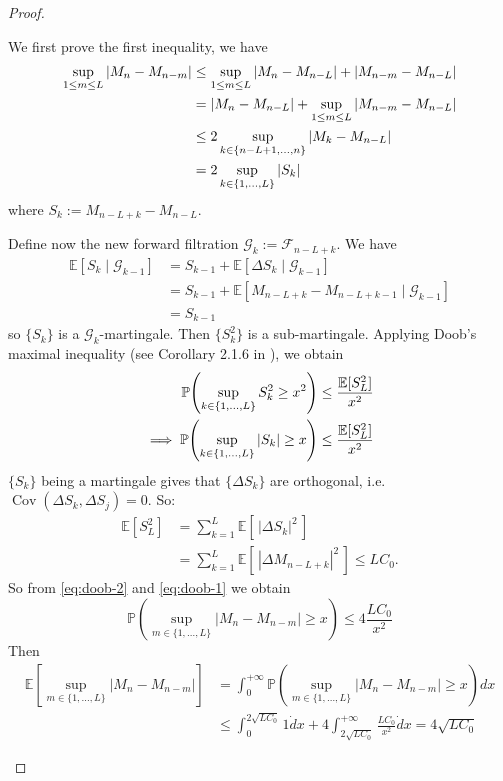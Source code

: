 \begin{proof}
	\begin{enumerate}[label=(\roman*)]
		We first prove the first inequality, we have 
		\begin{align}
			\sup_{1 \le m \le L} |M_n - M_{n-m}| 
			&\le \sup_{1 \le m \le L} |M_n - M_{n-L}| + |M_{n-m} - M_{n-L}|\\
			&= |M_n - M_{n-L}| + \sup_{1 \le m \le L} |M_{n-m} - M_{n-L}|\notag\\
			&\le 2 \sup_{k \in \{n-L+1, \dots, n\}} |M_k - M_{n-L}|\notag\\
			&= 2 \sup_{k \in \{1, \dots, L\}} |S_k|\label{eq:doob-2}
		\end{align}
		where \(S_k := M_{n-L+k} - M_{n-L}.\) 
		
		Define now the new forward filtration \(\mathcal{G}_k := \mathcal{F}_{n-L+k}\). 
		We have 
		\begin{align*}
			\mathbb{E}[S_k \mid \mathcal{G}_{k-1}] 
			&= S_{k-1} + \mathbb{E}[\Delta S_k\mid \mathcal{G}_{k-1}]\\
			&= S_{k-1} + \mathbb{E}[M_{n-L+k} - M_{n-L+k-1} \mid \mathcal{G}_{k-1}]\\
			&= S_{k-1}
		\end{align*}
		so \(\{S_k\}\) is a \(\mathcal{G}_k\)-martingale. Then \(\{S_k^2\}\) is a sub-martingale. Applying Doob's maximal inequality (see Corollary 2.1.6 in \cite{marc-yor}), we obtain
		\begin{align}
			\mathbb{P}\!\left( \sup_{k \in \{1,\dots,L\}} S_k^2 \ge x^2 \right)
			&\le \frac{\mathbb{E}[S_L^2]}{x^2}\notag\\
			\implies \mathbb{P}\!\left( \sup_{k \in \{1,\dots,L\}} |S_k| \ge x \right)
			&\le \frac{\mathbb{E}[S_L^2]}{x^2}\label{eq:doob-1}
		\end{align}
		\(\{S_k\}\) being a martingale gives that \(\{\Delta S_k\}\) are orthogonal,  
		i.e. \(\operatorname{Cov}(\Delta S_k, \Delta S_j)=0\). So:
		\begin{align*}
			\mathbb{E}[S_L^2]
			&= \sum_{k=1}^L \mathbb{E}[\,|\Delta S_k|^2\,]\\
			&= \sum_{k=1}^L \mathbb{E}\!\left[\,|\Delta M_{n-L+k}|^2\,\right]\le L C_0.		
		\end{align*}	
		So from \eqref{eq:doob-2} and \eqref{eq:doob-1} we obtain 
		\[
		\mathbb{P}\!\left( \sup_{m \in \{1,\dots,L\}} |M_n - M_{n-m}| \ge x \right)
		\le 4\frac{LC_0}{x^2}
		\]	
		Then
		\begin{align*}
			\mathbb{E}\left[\sup_{m \in \{1,\dots,L\}} |M_n - M_{n-m}|\right] &= \int_{0}^{+\infty}\mathbb{P}\!\left( \sup_{m \in \{1,\dots,L\}} |M_n - M_{n-m}| \ge x \right) dx\\
			&\leq \int_{0}^{2\sqrt{LC_0}}1 \dot dx + 4\int_{2\sqrt{LC_0}}^{+\infty}\frac{LC_0}{x^2} \dot dx = 4\sqrt{LC_0}
		\end{align*}
		

\end{enumerate}
\end{proof}
